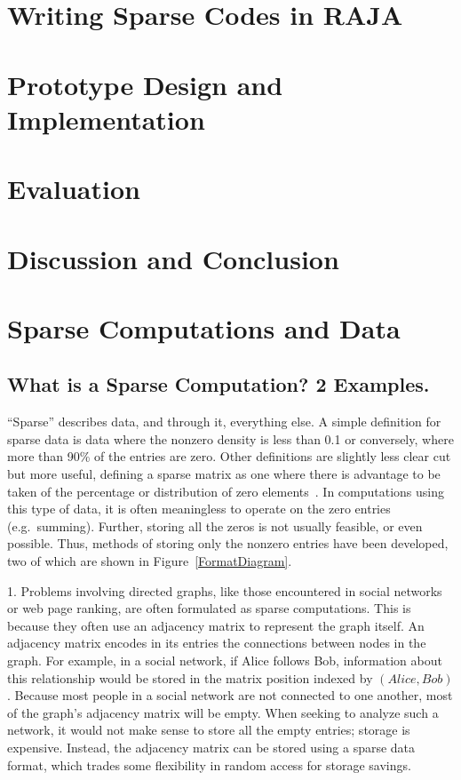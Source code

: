 \section{Writing Sparse Codes in RAJA}\label{sec:IndexSets}

\section{Prototype Design and Implementation}\label{sec:SparseRAJA}

\section{Evaluation}\label{sec:SparseEval}

\section{Discussion and Conclusion}\label{sec:SparseDiscussion}


\section{Sparse Computations and Data}

\subsection{What is a Sparse Computation? 2 Examples.}

``Sparse'' describes data, and through it, everything else.
A simple definition for sparse data is data where the nonzero density is less than 0.1 or conversely, where more than 90\% of the entries are zero.
Other definitions are slightly less clear cut but more useful, defining a sparse matrix as one where there is advantage to be taken of the percentage or distribution of zero elements~\cite{duff1977survey}.
In computations using this type of data, it is often meaningless to operate on the zero entries (e.g.\ summing).
Further, storing all the zeros is not usually feasible, or even possible.
Thus, methods of storing only the nonzero entries have been developed, two of which are shown in Figure~\ref{FormatDiagram}.

1.
Problems involving directed graphs, like those encountered in social networks or web page ranking, are often formulated as sparse computations. 
This is because they often use an adjacency matrix to represent the graph itself.
An adjacency matrix encodes in its entries the connections between nodes in the graph. 
For example, in a social network, if Alice follows Bob, information about this relationship would be stored in the matrix position indexed by $(Alice,Bob)$. 
Because most people in a social network are not connected to one another, most of the graph's adjacency matrix will be empty.
When seeking to analyze such a network, it would not make sense to store all the empty entries; storage is expensive.
Instead, the adjacency matrix can be stored using a sparse data format, which trades some flexibility in random access for storage savings.

